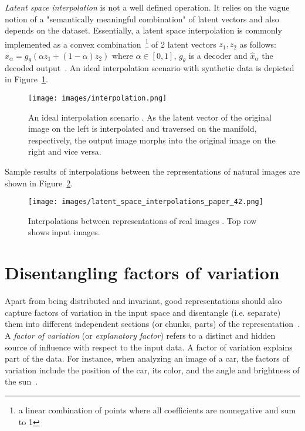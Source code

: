 \documentclass[a4paper,12pt]{report}
\begin{document}
\textit{Latent space interpolation} is not a well defined operation. It relies on the vague notion of a "semantically meaningful combination" of latent vectors and also depends on the dataset. Essentially, a latent space interpolation is commonly implemented as a convex combination~\footnote{a linear combination of points where all coefficients are nonnegative and sum to 1} of 2 latent vectors $z_1, z_2$ as follows: $\hat{x}_{\alpha} = g_{\theta}(\alpha z_1+(1-\alpha)z_2)$ where $\alpha \in [0,1]$, $g_{\theta}$ is a decoder and $\hat{x}_{\alpha}$ the decoded output~\cite{AE_Interp}. An ideal interpolation scenario with synthetic data is depicted in Figure~\ref{fig:interpolation_ideal}.
\begin{figure}[ht]
\centering
\texttt{[image: images/interpolation.png]}
\caption{An ideal interpolation scenario \cite{InkscapeInterpolation}. As the latent vector of the original image on the left is interpolated and traversed on the manifold, respectively, the output image morphs into the original image on the right and vice versa.}
\label{fig:interpolation_ideal}
\end{figure}

Sample results of interpolations between the representations of natural images are shown in Figure~\ref{fig:interpolation_real}.
\begin{figure}[ht]
\centering
\texttt{[image: images/latent\_space\_interpolations\_paper\_42.png]}
\caption{Interpolations between representations of real images \cite{InterpolExamples}. Top row shows input images.}
\label{fig:interpolation_real}
\end{figure}


\section{Disentangling factors of variation}\label{subsec:unsupDFoV}
Apart from being distributed and invariant, good representations should also capture factors of variation in the input space and disentangle (i.e. separate) them into different independent sections (or chunks, parts) of the representation~\cite{ReprLearning}. A \textit{factor of variation} (or \textit{explanatory factor}) refers to a distinct and hidden source of influence with respect to the input data. A factor of variation explains part of the data. For instance, when analyzing an image of a car, the factors of variation include the position of the car, its color, and the angle and brightness of the sun~\cite{DeepLearningBook}.
\end{document}
